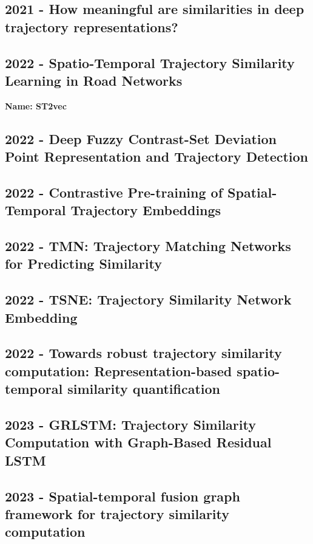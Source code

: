 \subsection*{2021 - How meaningful are similarities in deep trajectory representations?}
\cite{taghizadeh2021meaningful}

\subsection*{2022 - Spatio-Temporal Trajectory Similarity Learning in Road Networks}
\textbf{Name: ST2vec}

\cite{fang2022spatio}

\subsection*{2022 - Deep Fuzzy Contrast-Set Deviation Point Representation and Trajectory Detection}
\cite{ahmed2022deep}

\subsection*{2022 - Contrastive Pre-training of Spatial-Temporal Trajectory Embeddings}
\cite{lin2022contrastive}

\subsection*{2022 - TMN: Trajectory Matching Networks for Predicting Similarity}
\cite{yang2022tmn}

\subsection*{2022 - TSNE: Trajectory Similarity Network Embedding}
\cite{ding2022tsne}

\subsection*{2022 - Towards robust trajectory similarity computation: Representation-based spatio-temporal similarity quantification}
\cite{chen2022towards}

\subsection*{2023 - GRLSTM: Trajectory Similarity Computation with Graph-Based Residual LSTM}
\cite{zhou2023grlstm}

\subsection*{2023 - Spatial-temporal fusion graph framework for trajectory similarity computation}
\cite{zhou2023spatial}

